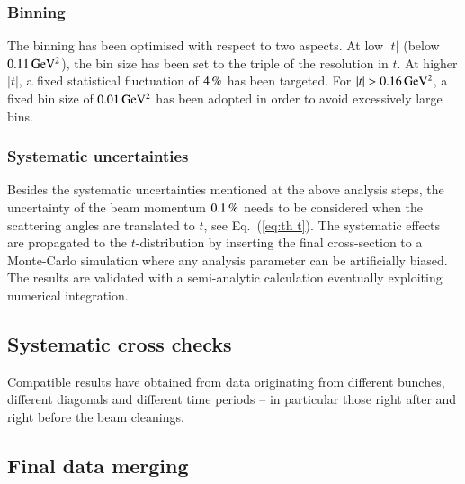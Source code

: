
\subsubsection{Binning}
\label{sec:binning}

The binning has been optimised with respect to two aspects. At low $|t|$ (below $0.11\,{\rm GeV^2}$), the bin size has been set to the triple of the resolution in $t$. At higher $|t|$, a fixed statistical fluctuation of $4\,{\rm \%}$ has been targeted. For $|t| > 0.16\,{\rm GeV^2}$, a fixed bin size of $0.01\,{\rm GeV^2}$ has been adopted in order to avoid excessively large bins.



\subsubsection{Systematic uncertainties}
\label{sec:systematics}

Besides the systematic uncertainties mentioned at the above analysis steps, the uncertainty of the beam momentum $0.1\,{\rm \%}$ needs to be considered when the scattering angles are translated to $t$, see Eq.~(\ref{eq:th t}). The systematic effects are propagated to the $t$-distribution by inserting the final cross-section to a Monte-Carlo simulation where any analysis parameter can be artificially biased. The results are validated with a semi-analytic calculation eventually exploiting numerical integration.



\subsection{Systematic cross checks}
\label{sec:cross checks}

Compatible results have obtained from data originating from different bunches, different diagonals and different time periods -- in particular those right after and right before the beam cleanings.



\subsection{Final data merging}
\label{sec:final data merging}

